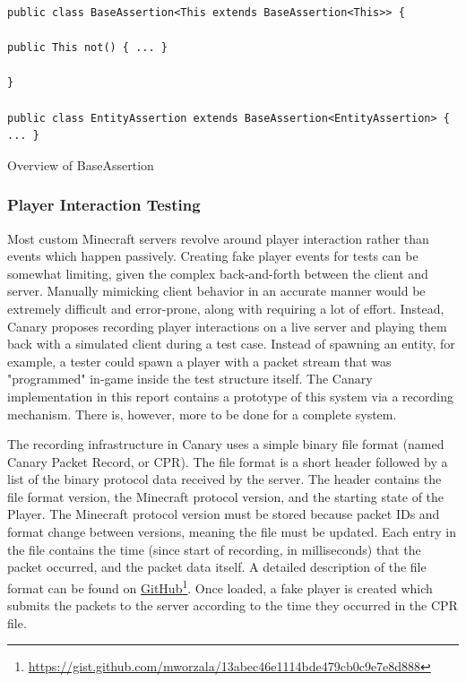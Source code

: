 \documentclass[12pt]{article}
\begin{document}
\begin{onehalfspacing}
\begin{listing}[H]
\begin{verbatim}
public class BaseAssertion<This extends BaseAssertion<This>> {

public This not() { ... }

}

public class EntityAssertion extends BaseAssertion<EntityAssertion> { ... }

\end{verbatim}
\caption{Overview of BaseAssertion}
\label{lst:4_2_2_2}
\end{listing}

\subsubsection{Player Interaction Testing}

Most custom Minecraft servers revolve around player interaction rather
than events which happen passively. Creating fake player events for
tests can be somewhat limiting, given the complex back-and-forth between
the client and server. Manually mimicking client behavior in an accurate
manner would be extremely difficult and error-prone, along with
requiring a lot of effort. Instead, Canary proposes recording player
interactions on a live server and playing them back with a simulated
client during a test case. Instead of spawning an entity, for example, a
tester could spawn a player with a packet stream that was "programmed"
in-game inside the test structure itself. The Canary implementation in
this report contains a prototype of this system via a recording
mechanism. There is, however, more to be done for a complete system.

The recording infrastructure in Canary uses a simple binary file format
(named Canary Packet Record, or CPR). The file format is a short header
followed by a list of the binary protocol data received by the server.
The header contains the file format version, the Minecraft protocol
version, and the starting state of the Player. The Minecraft protocol
version must be stored because packet IDs and format change between
versions, meaning the file must be updated. Each entry in the file
contains the time (since start of recording, in milliseconds) that the
packet occurred, and the packet data itself. A detailed description of
the file format can be found on
\href{https://gist.github.com/mworzala/13abec46e1114bde479cb0c9e7e8d888}{{GitHub}}\footnote{\url{https://gist.github.com/mworzala/13abec46e1114bde479cb0c9e7e8d888}}.
Once loaded, a fake player is created which submits the packets to the
server according to the time they occurred in the CPR file.


\end{onehalfspacing}
\end{document}
